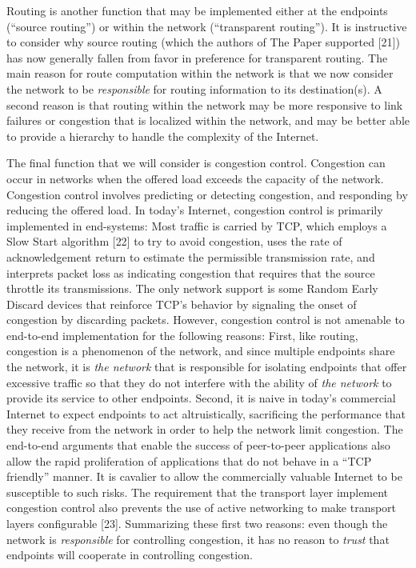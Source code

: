 \documentclass[a4paper,11pt,notitlepage,twoside,openright]{article}
\begin{document}
Routing is another function that may be implemented either at the
endpoints (``source routing'') or within the network (``transparent
routing''). It is instructive to consider why source routing (which the
authors of The Paper supported {[}21{]}) has now generally fallen from
favor in preference for transparent routing. The main reason for route
computation within the network is that we now consider the network to be
\emph{responsible} for routing information to its destination(s). A
second reason is that routing within the network may be more responsive
to link failures or congestion that is localized within the network, and
may be better able to provide a hierarchy to handle the complexity of
the Internet.

The final function that we will consider is congestion control.
Congestion can occur in networks when the offered load exceeds the
capacity of the network. Congestion control involves predicting or
detecting congestion, and responding by reducing the offered load. In
today's Internet, congestion control is primarily implemented in
end-systems: Most traffic is carried by TCP, which employs a Slow Start
algorithm {[}22{]} to try to avoid congestion, uses the rate of
acknowledgement return to estimate the permissible transmission rate,
and interprets packet loss as indicating congestion that requires that
the source throttle its transmissions. The only network support is some
Random Early Discard devices that reinforce TCP's behavior by signaling
the onset of congestion by discarding packets. However, congestion
control is not amenable to end-to-end implementation for the following
reasons: First, like routing, congestion is a phenomenon of the network,
and since multiple endpoints share the network, it is \emph{the network}
that is responsible for isolating endpoints that offer excessive traffic
so that they do not interfere with the ability of \emph{the network} to
provide its service to other endpoints. Second, it is naive in today's
commercial Internet to expect endpoints to act altruistically,
sacrificing the performance that they receive from the network in order
to help the network limit congestion. The end-to-end arguments that
enable the success of peer-to-peer applications also allow the rapid
proliferation of applications that do not behave in a ``TCP friendly''
manner. It is cavalier to allow the commercially valuable Internet to be
susceptible to such risks. The requirement that the transport layer
implement congestion control also prevents the use of active networking
to make transport layers configurable {[}23{]}. Summarizing these first
two reasons: even though the network is \emph{responsible} for
controlling congestion, it has no reason to \emph{trust} that endpoints
will cooperate in controlling congestion.
\end{document}
